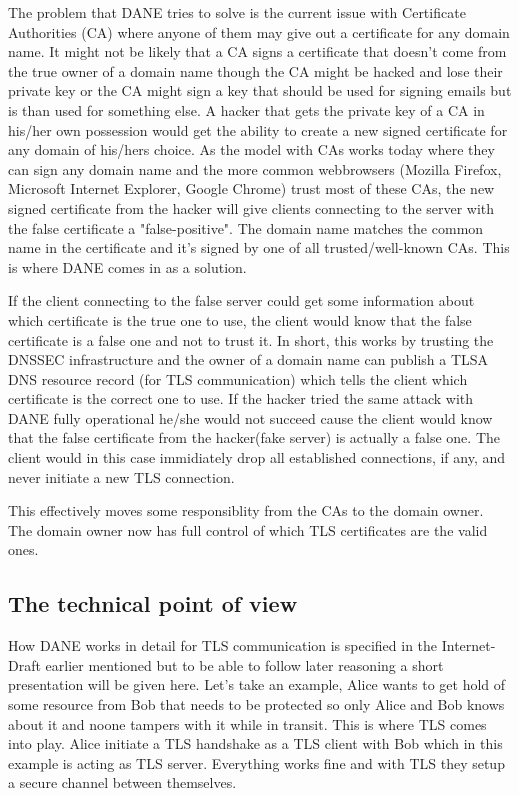 The problem that DANE tries to solve is the current issue with Certificate Authorities (CA) where anyone of them may give out a certificate for any domain name.
It might not be likely that a CA signs a certificate that doesn't come from the true owner of a domain name though the CA might be hacked and lose their private key or the CA might sign a key that should be used for signing emails but is than used for something else.
A hacker that gets the private key of a CA in his/her own possession would get the ability to create a new signed certificate for any domain of his/hers choice.
As the model with CAs works today where they can sign any domain name and the more common webbrowsers (Mozilla Firefox, Microsoft Internet Explorer, Google Chrome) trust most of these CAs, the new signed certificate from the hacker will give clients connecting to the server with the false certificate a "false-positive".
The domain name matches the common name in the certificate and it's signed by one of all trusted/well-known CAs.
This is where DANE comes in as a solution.

If the client connecting to the false server could get some information about which certificate is the true one to use, the client would know that the false certificate is a false one and not to trust it.
In short, this works by trusting the DNSSEC infrastructure and the owner of a domain name can publish a TLSA DNS resource record (for TLS communication) which tells the client which certificate is the correct one to use.
If the hacker tried the same attack with DANE fully operational he/she would not succeed cause the client would know that the false certificate from the hacker(fake server) is actually a false one.
The client would in this case immidiately drop all established connections, if any, and never initiate a new TLS connection.

This effectively moves some responsiblity from the CAs to the domain owner.
The domain owner now has full control of which TLS certificates are the valid ones.

\subsection{The technical point of view}
How DANE works in detail for TLS communication is specified in the Internet-Draft earlier mentioned\cite{rfc:draft-dane} but to be able to follow later reasoning a short presentation will be given here.
Let's take an example, Alice wants to get hold of some resource from Bob that needs to be protected so only Alice and Bob knows about it and noone tampers with it while in transit.
This is where TLS comes into play.
Alice initiate a TLS handshake as a TLS client with Bob which in this example is acting as TLS server. 
Everything works fine and with TLS they setup a secure channel between themselves.

